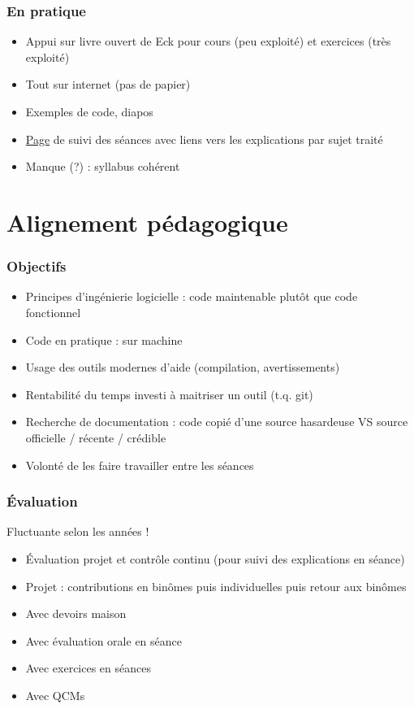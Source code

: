 \documentclass[french]{beamer}
\begin{document}
\begin{frame}
	\frametitle{En pratique}
	\begin{itemize}
		\item Appui sur livre ouvert de Eck pour cours (peu exploité) et exercices (très exploité)
		\item Tout sur internet (pas de papier)
		\item Exemples de code, diapos
		\item \href{https://github.com/oliviercailloux/java-course/blob/master/Divers/L3a.adoc}{Page} de suivi des séances avec liens vers les explications par sujet traité
		\item Manque (?) : syllabus cohérent
	\end{itemize}
\end{frame}

\section{Alignement pédagogique}
\begin{frame}
	\frametitle{Objectifs}
	\begin{itemize}
		\item Principes d’ingénierie logicielle : code maintenable plutôt que code fonctionnel
		\item Code en pratique : sur machine
		\item Usage des outils modernes d’aide (compilation, avertissements)
		\item Rentabilité du temps investi à maitriser un outil (t.q. git)
		\item Recherche de documentation : code copié d’une source hasardeuse VS source officielle / récente / crédible
		\item Volonté de les faire travailler entre les séances
	\end{itemize}
\end{frame}

\begin{frame}
	\frametitle{Évaluation}
	Fluctuante selon les années !
	\begin{itemize}
		\item Évaluation projet et contrôle continu (pour suivi des explications en séance)
		\item Projet : contributions en binômes puis individuelles puis retour aux binômes
		\item Avec devoirs maison
		\item Avec évaluation orale en séance
		\item Avec exercices en séances
		\item Avec QCMs
	\end{itemize}
\end{frame}
\end{document}
